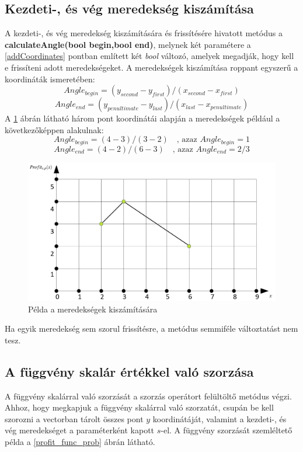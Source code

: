 \subsection{Kezdeti-, és vég meredekség kiszámítása} \label{calculateAngle}
A  kezdeti-, és vég meredekség kiszámítására és frissítésére hivatott metódus a \textbf{calculateAngle(bool begin,bool end)}, melynek két paramétere a \ref{addCoordinates} pontban említett két \textit{bool} változó, amelyek megadják, hogy kell e frissíteni adott meredekségeket. A meredekségek kiszámítása roppant egyszerű a koordináták ismeretében:
$$Angle_{begin}=(y_{second}-y_{first}) / (x_{second}-x_{first})$$
$$Angle_{end}=(y_{penultimate}-y_{last}) / (x_{last}-x_{penultimate})$$
A \ref{calculate angle} ábrán látható három pont koordinátái alapján a meredekségek például a következőképpen alakulnak: 
$$Angle_{begin}=(4-3) / (3-2)\quad \text{, azaz } Angle_{begin}=1$$
$$Angle_{end}=(4-2) / (6-3)\quad \text{, azaz } Angle_{end}=2/3$$
\begin{figure}[H]
\begin{center}
\includegraphics[scale=0.375]{calculate_angle}
\caption{Példa a meredekségek kiszámítására}
\label{calculate angle}
\end{center}
\end{figure}
Ha egyik meredekség sem szorul frissítésre, a metódus semmiféle változtatást nem tesz.
\subsection{A függvény skalár értékkel való szorzása} \label{multiplyByScalar}
A függvény skalárral való szorzását a szorzás operátort felültöltő metódus végzi. Ahhoz, hogy megkapjuk a függvény skalárral való szorzatát, csupán be kell szorozni a vectorban tárolt összes pont $y$ koordinátáját, valamint a kezdeti-, és vég meredekséget a paraméterként kapott $s$-el. A függvény szorzását szemléltető példa a \ref{profit_func_prob} ábrán látható.
